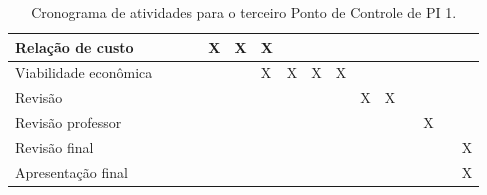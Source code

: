 \begin{table}[H]
\begin{tabular}{|p{2.5cm}|p{0.5cm}|p{0.5cm}|p{0.5cm}|p{0.5cm}|p{0.5cm}|p{0.5cm}|p{0.5cm}|p{0.5cm}|p{0.5cm}|p{0.5cm}|p{0.5cm}|p{0.5cm}|p{0.5cm}|p{0.5cm}|p{0.5cm}|}
Relação de custo      &                           &                           &                           & \cellcolor[HTML]{FE0000}X & \cellcolor[HTML]{FE0000}X & \cellcolor[HTML]{FE0000}X &                           &                           &                           &                           &                           &       &                           &       &                           \\ \hline
Viabilidade econômica &                           &                           &                           &                           &                           & \cellcolor[HTML]{FE0000}X & \cellcolor[HTML]{FE0000}X & \cellcolor[HTML]{FE0000}X & \cellcolor[HTML]{FE0000}X &                           &                           &       &                           &       &                           \\ \hline
Revisão               &                           &                           &                           &                           &                           &                           &                           &                           &                           & \cellcolor[HTML]{FE0000}X & \cellcolor[HTML]{FE0000}X &       &                           &       &                           \\ \hline
Revisão professor     &                           &                           &                           &                           &                           &                           &                           &                           &                           &                           &                           &       & \cellcolor[HTML]{FE0000}X &       &                           \\ \hline
Revisão final         &                           &                           &                           &                           &                           &                           &                           &                           &                           &                           &                           &       &                           &       & \cellcolor[HTML]{FE0000}X \\ \hline
Apresentação final    &                           &                           &                           &                           &                           &                           &                           &                           &                           &                           &                           &       &                           &       & \cellcolor[HTML]{FE0000}X \\ \hline
\end{tabular}

  \caption{Cronograma de atividades para o terceiro  Ponto de Controle de PI 1.}
  \label{tab:cronograma3}
\end{table}

